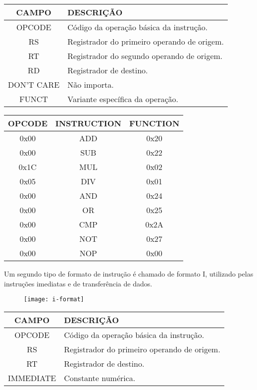 \begin{table}[H]
\centering	
\begin{tabular}{|c|l|}
	\hline 
	\cellcolor[gray]{0.9}\textbf{CAMPO} & \cellcolor[gray]{0.9}\textbf{DESCRIÇÃO} \\ 
	\hline 
	OPCODE & Código da operação básica da instrução. \\ 
	\hline 
	RS & Registrador do primeiro operando de origem. \\ 
	\hline 
	RT & Registrador do segundo operando de origem. \\ 
	\hline 
	RD & Registrador de destino. \\ 
	\hline 
	DON'T CARE & Não importa. \\ 
	\hline 
	FUNCT & Variante específica da operação. \\ 
	\hline 
	\end{tabular} 
	\end{table}	

\begin{table}[H]
\centering
	\begin{tabular}{|c|c|c|}
  	\hline 
  	\cellcolor[gray]{0.9}\textbf{OPCODE} & \cellcolor[gray]{0.9}\textbf{INSTRUCTION} & \cellcolor[gray]{0.9}\textbf{FUNCTION} \\ 
  	\hline 
  	0x00 & ADD & 0x20 \\ 
  	\hline 
  	0x00 & SUB & 0x22 \\ 
  	\hline 
  	0x1C & MUL & 0x02 \\ 
  	\hline 
  	0x05 & DIV & 0x01 \\ 
  	\hline 
  	0x00 & AND & 0x24 \\ 
  	\hline 
  	0x00 & OR & 0x25 \\ 
  	\hline 
  	0x00 & CMP & 0x2A \\ 
  	\hline 
  	0x00 & NOT & 0x27 \\ 
  	\hline
  	0x00 & NOP & 0x00 \\
  	\hline 
  	\end{tabular} 
  \end{table} 
  	 	
  	
	 Um segundo tipo de formato de instrução é chamado de formato I, utilizado pelas instruções imediatas e de transferência de dados.
	\begin{figure}[H]
    	\centering
    	\texttt{[image: i-format]}
  	\end{figure}
  	
  	\begin{table}[H]
\centering	
\begin{tabular}{|c|l|}
	\hline 
	\cellcolor[gray]{0.9}\textbf{CAMPO} & \cellcolor[gray]{0.9}\textbf{DESCRIÇÃO} \\ 
	\hline 
	OPCODE & Código da operação básica da instrução. \\ 
	\hline 
	RS & Registrador do primeiro operando de origem. \\ 
	\hline 
	RT & Registrador de destino. \\ 
	\hline 
	IMMEDIATE & Constante numérica. \\ 
	\hline 
	\end{tabular} 
	\end{table}
	
